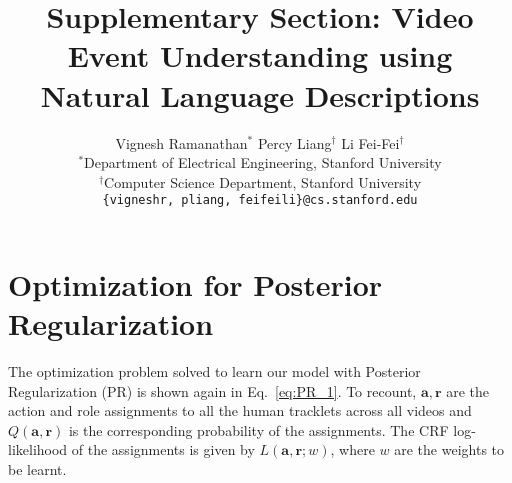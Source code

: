 \documentclass[10pt,twocolumn,letterpaper]{article}
\begin{document}
\title{Supplementary Section: Video Event Understanding using Natural Language Descriptions}

\author{Vignesh Ramanathan$^*$ \quad \quad Percy Liang$^\dagger$ \quad \quad Li Fei-Fei$^\dagger$ \\
$^*$Department of Electrical Engineering, Stanford University \\
$^\dagger$Computer Science Department, Stanford University\\
{\tt\small \{vigneshr, pliang, feifeili\}@cs.stanford.edu}
}\maketitle

\renewcommand{\thesection} {\Alph{section}}

\section{Optimization for Posterior Regularization} \label{sec:PR_opt}

The optimization problem solved to learn our model with Posterior Regularization (PR) is shown again in Eq.~\ref{eq:PR_1}. To recount, $\mathbf{a}, \mathbf{r}$ are the action and role assignments to all the human tracklets across all videos and $Q(\mathbf{a}, \mathbf{r})$ is the corresponding probability of the assignments. The CRF log-likelihood of the assignments is given by $L(\mathbf{a}, \mathbf{r}; w)$, where $w$ are the weights to be learnt.
\end{document}

